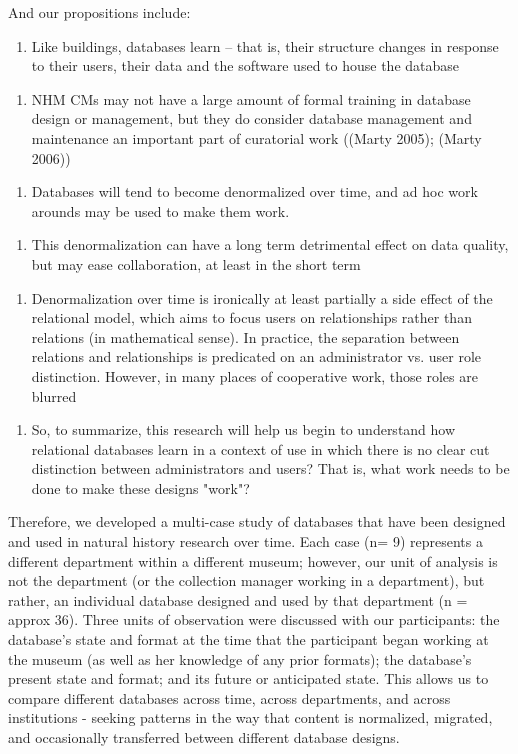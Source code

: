 And our propositions include:
\begin{enumerate}
\item Like buildings, databases learn -- that is, their structure changes in response to their users, their data and the software used to house the database
\end{enumerate}
\begin{enumerate}
\item NHM CMs may not have a large amount of formal training in database design or management, but they do consider database management and maintenance an important part of curatorial work ((Marty 2005); (Marty 2006))
\end{enumerate}
\begin{enumerate}
\item Databases will tend to become denormalized over time, and ad hoc work arounds may be used to make them work.
\end{enumerate}
\begin{enumerate}
\item This denormalization can have a long term detrimental effect on data quality, but may ease collaboration, at least in the short term
\end{enumerate}
\begin{enumerate}
\item Denormalization over time is ironically at least partially a side effect of the relational model, which aims to focus users on relationships rather than relations (in mathematical sense). In practice, the separation between relations and relationships is predicated on an administrator vs. user role distinction. However, in many places of cooperative work, those roles are blurred
\end{enumerate}
\begin{enumerate}
\item So, to summarize, this research will help us begin to understand how relational databases learn in a context of use in which there is no clear cut distinction between administrators and users? That is, what work needs to be done to make these designs "work"?
\end{enumerate}

Therefore, we developed a multi-case study of databases that have been designed and used in natural history research over time. Each case (n= 9) represents a different department within a different museum; however, our unit of analysis is not the department (or the collection manager working in a department), but rather, an individual database designed and used by that department (n = approx 36). Three units of observation were discussed with our participants: the database's state and format at the time that the participant began working at the museum (as well as her knowledge of any prior formats); the database's present state and format; and its future or anticipated state. This allows us to compare different databases across time, across departments, and across institutions - seeking patterns in the way that content is normalized, migrated, and occasionally transferred between different database designs. 

